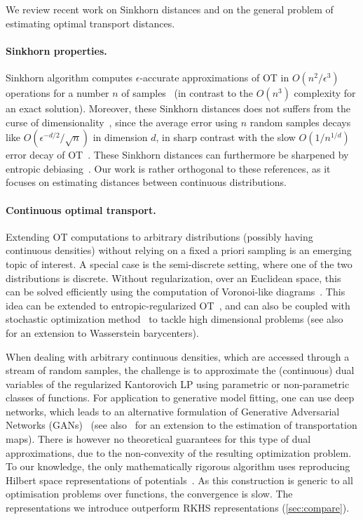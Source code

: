 We review recent work on Sinkhorn distances and on the general problem of estimating optimal transport distances. 

\paragraph{Sinkhorn properties.} Sinkhorn algorithm computes $\epsilon$-accurate
approximations of OT in $O(n^2/\epsilon^3)$ operations for a number $n$ of
samples~\citep{altschuler2017near} (in contrast to the $O(n^3)$ complexity for an
exact solution). Moreover, these Sinkhorn distances does not suffers from the
curse of dimensionality~\citep{2019-Genevay-aistats}, since the average error
using $n$ random samples decays like $O(\epsilon^{-d/2}/\sqrt{n})$ in dimension
$d$, in sharp contrast with the slow $O(1/n^{1/d})$ error decay of
OT~\citep{dudley_speed_1969,weed2019sharp}. These Sinkhorn distances can furthermore be sharpened
by entropic debiasing~\citep{2019-Feydy-aistats}. Our work is rather orthogonal to these references, as it focuses on estimating distances between continuous distributions.

\paragraph{Continuous optimal transport.} Extending OT computations to arbitrary
distributions (possibly having continuous densities) without relying on a fixed
a priori sampling is an emerging topic of interest. A special case is the
semi-discrete setting, where one of the two distributions is discrete. Without
regularization, over an Euclidean space, this can be solved efficiently using
the computation of Voronoi-like diagrams~\citep{merigot2011multiscale}. This
idea can be extended to entropic-regularized OT~\citep{cuturi2018semidual}, and
can also be coupled with stochastic optimization
method~\citep{2016-genevay-nips} to tackle high dimensional problems (see
also~\citet{staib2017parallel} for an extension to Wasserstein barycenters). 

When dealing with arbitrary continuous densities, which are accessed through a
stream of random samples, the challenge is to approximate  the (continuous) dual
variables of the regularized Kantorovich LP using parametric or non-parametric
classes of functions. For application to generative model fitting, one can use
deep networks, which leads to an alternative formulation of Generative
Adversarial Networks (GANs)~\citep{arjovsky2017wgan} (see
also~\citet{seguy2018large} for an extension to the estimation of transportation
maps). There is however no theoretical guarantees for this type of dual
approximations, due to the non-convexity of the resulting optimization problem.
To our knowledge, the only mathematically rigorous algorithm uses reproducing
Hilbert space representations of potentials~\citep{2016-genevay-nips}. As this
construction is generic to all optimisation problems over functions, the convergence is slow. The representations we introduce outperform RKHS representations (\autoref{sec:compare}).